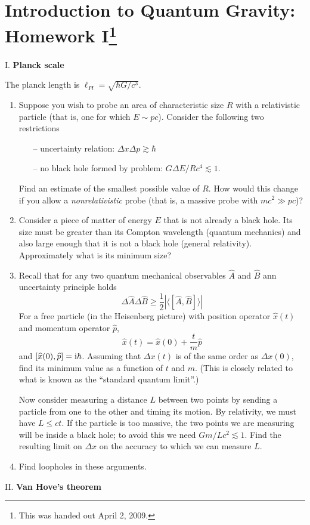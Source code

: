 \section[Homework I]{Introduction to Quantum Gravity: Homework I\footnote{This was handed out April 2, 2009.}}


I. \textbf{Planck scale}

The planck length is $\ell_{Pl} = \sqrt{\hbar G/c^{3}}$.
\begin{enumerate}[label=(\alph*),nosep]
\item Suppose you wish to probe an area of characteristic size $R$ with
  a relativistic particle (that is, one for which $E\sim pc$). Consider
  the following two restrictions
  \begin{itemize}
  \item[--] uncertainty relation: $\Delta x\Delta p\gtrsim\hbar$
  \item[--] no black hole formed by problem: $G\Delta E/R c^{4}\lesssim 1$.
  \end{itemize}
  Find an estimate of the smallest possible value of $R$. How would this
  change if you allow a \emph{nonrelativistic} probe (that is, a massive
  probe with $mc^{2}\gg pc$)?
\item Consider a piece of matter of energy $E$ that is not already a
  black hole. Its size must be greater than its Compton wavelength
  (quantum mechanics) and also large enough that it is not a black hole
  (general relativity). Approximately what is its minimum size?
\item Recall that for any two quantum mechanical observables
  $\widehat{A}$ and $\widehat{B}$ ann uncertainty principle holds
  \begin{equation*}
\Delta\widehat{A}\Delta\widehat{B}\geq\frac{1}{2}|\langle[\widehat{A},\widehat{B}]\rangle|
  \end{equation*}
  For a free particle (in the Heisenberg picture) with position operator
  $\widehat{x}(t)$ and momentum operator $\widehat{p}$,
  \begin{equation*}
    \widehat{x}(t) = \widehat{x}(0) + \frac{t}{m}\widehat{p}
  \end{equation*}
  and $[\widehat{x}(0),\widehat{p}]=\mathrm{i}\hbar$. Assuming that $\Delta x(t)$
  is of the same order as $\Delta x(0)$, find its minimum value as a
  function of $t$ and $m$. (This is closely related to what is known as
  the ``standard quantum limit''.)

  Now consider measuring a distance $L$ between two points by sending a
  particle from one to the other and timing its motion. By relativity,
  we must have $L\leq ct$. If the particle is too massive, the two
  points we are measuring will be inside a black hole; to avoid this we
  need $Gm/Lc^{2}\lesssim1$. Find the resulting limit on $\Delta x$
  on the accuracy to which we can measure $L$.
\item Find loopholes in these arguments.
\end{enumerate}
\bigbreak\noindent{}II. \textbf{Van Hove's theorem}\bigbreak

